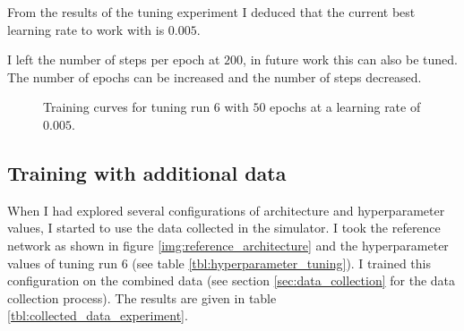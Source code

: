 \documentclass[11pt, onecolumn, oneside, reqno]{article}
\begin{document}
{{{From the results of the tuning experiment I deduced that the current best learning rate to work with is $0.005$. 

I left the number of steps per epoch at $200$, in future work this can also be tuned. The number of epochs can be increased and the number of steps decreased.

\begin{figure}
\noindent
{}
\caption[Training curves for tuning run 6]{Training curves for tuning run $6$ with $50$ epochs at a learning rate of $0.005$.}
\label{img:training_curves_tune_6}
\end{figure}

\subsection{Training with additional data}
\label{sec:training_additional_data}
When I had explored several configurations of architecture and hyperparameter values, I started to use the data collected in the simulator. I took the reference network as shown in figure \ref{img:reference_architecture} and the hyperparameter values of tuning run $6$ (see table \ref{tbl:hyperparameter_tuning}). I trained this configuration on the combined data (see section \ref{sec:data_collection} for the data collection process). The results are given in table \ref{tbl:collected_data_experiment}.

}}}
\end{document}
